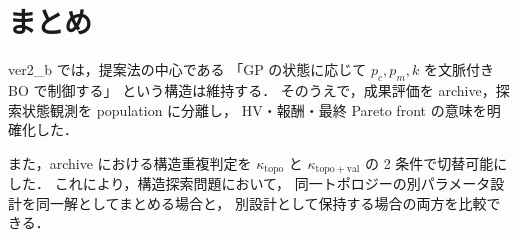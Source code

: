 \documentclass[a4paper,11pt]{ltjsarticle}
\begin{document}
\section{まとめ}

ver2\_b では，提案法の中心である
「GP の状態に応じて \(p_c,p_m,k\) を文脈付き BO で制御する」
という構造は維持する．
そのうえで，成果評価を archive，探索状態観測を population に分離し，
HV・報酬・最終 Pareto front の意味を明確化した．

また，archive における構造重複判定を
\(\kappa_{\mathrm{topo}}\) と
\(\kappa_{\mathrm{topo+val}}\)
の 2 条件で切替可能にした．
これにより，構造探索問題において，
同一トポロジーの別パラメータ設計を同一解としてまとめる場合と，
別設計として保持する場合の両方を比較できる．
\end{document}
